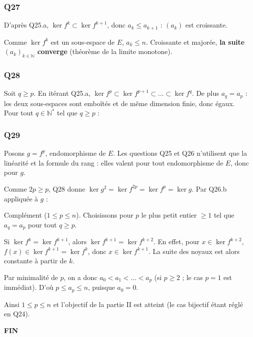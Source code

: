 \documentclass[11pt,a4paper]{article}
\newcommand{\equationajustee}[1]{%
  \sbox{\boiteequation}{$\displaystyle #1$}%
  \ifdim\wd\boiteequation>\linewidth
    \[\resizebox{\linewidth}{!}{\usebox{\boiteequation}}\]%
  \else
    \[#1\]%
  \fi}
\begin{document}
\hypertarget{q27}{%
\subsubsection{Q27}\label{q27}}

D'après Q25.a, \(\ker f^k\subset\ker f^{k+1}\), donc \(a_k\le a_{k+1}\) : \((a_k)\) est croissante.

Comme \(\ker f^k\) est un sous-espace de \(E\), \(a_k\le n\). Croissante et majorée, \textbf{la suite \((a_k)_{k\in\mathbb N}\) converge} (théorème de la limite monotone).

\hypertarget{q28}{%
\subsubsection{Q28}\label{q28}}

Soit \(q\ge p\). En itérant Q25.a, \(\ker f^p\subset\ker f^{p+1}\subset\dots\subset\ker f^q\). De plus \(a_q=a_p\) : les deux sous-espaces sont emboîtés et de même dimension finie, donc égaux. Pour tout \(q\in\mathbb N^*\) tel que \(q\ge p\) :
\equationajustee{\boxed{\ker(f^q)=\ker(f^p)}.}

\hypertarget{q29}{%
\subsubsection{Q29}\label{q29}}

Posons \(g=f^p\), endomorphisme de \(E\). Les questions Q25 et Q26 n'utilisent que la linéarité et la formule du rang : elles valent pour tout endomorphisme de \(E\), donc pour \(g\).

Comme \(2p\ge p\), Q28 donne \(\ker g^2=\ker f^{2p}=\ker f^p=\ker g\). Par Q26.b appliquée à \(g\) :
\equationajustee{\boxed{E=\ker(f^p)\oplus\operatorname{Im}(f^p)}.}

Complément (\(1\le p\le n\)). Choisissons pour \(p\) le plus petit entier \(\ge1\) tel que \(a_q=a_p\) pour tout \(q\ge p\).

Si \(\ker f^k=\ker f^{k+1}\), alors \(\ker f^{k+1}=\ker f^{k+2}\). En effet, pour \(x\in\ker f^{k+2}\), \(f(x)\in\ker f^{k+1}=\ker f^k\), donc \(x\in\ker f^{k+1}\). La suite des noyaux est alors constante à partir de \(k\).

Par minimalité de \(p\), on a donc \(a_0<a_1<\dots<a_p\) (si \(p\ge2\) ; le cas \(p=1\) est immédiat). D'où \(p\le a_p\le n\), puisque \(a_0=0\).

Ainsi \(1\le p\le n\) et l'objectif de la partie II est atteint (le cas bijectif étant réglé en Q24).

\textbf{FIN}
\end{document}
